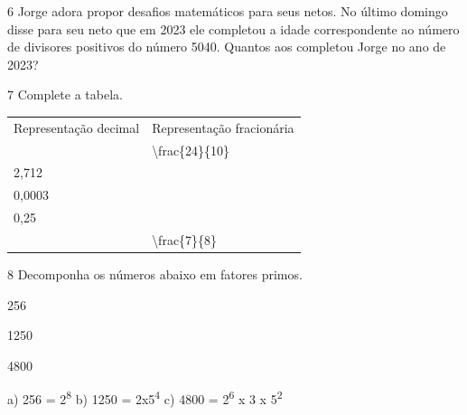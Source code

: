{%

\num{6} Jorge adora propor desafios matemáticos para seus netos. No
último domingo disse para seu neto que em 2023 ele completou a idade
correspondente ao número de divisores positivos do número 5040. Quantos
aos completou Jorge no ano de 2023?


\num{7} Complete a tabela.

\begin{table}[]
\begin{tabular}{ll}
\rowcolor[HTML]{9698ED} 
Representação decimal & Representação fracionária \\
 & \textbackslash{}frac\{24\}\{10\} \\
2,712 &  \\
0,0003 &  \\
0,25 &  \\
 & \textbackslash{}frac\{7\}\{8\}
\end{tabular}
\end{table}


\num{8} Decomponha os números abaixo em fatores primos.

\begin{escolha}
  \item 256

  \item 1250

  \item 4800

\end{escolha}

\coment{}
a) 256 = 2\textsuperscript{8}
b) 1250 = 2x5\textsuperscript{4}
c) 4800 = 2\textsuperscript{6} x 3 x 5\textsuperscript{2}
}


